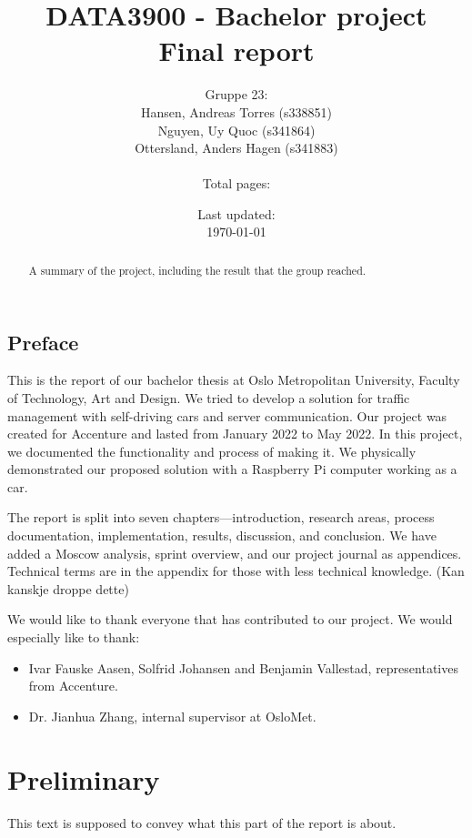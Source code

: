 \documentclass[14pt, a4paper, english]{report}
\title
{
	DATA3900 - Bachelor project \\
	Final report
}
\author{Gruppe 23:\\
    Hansen, Andreas Torres (s338851)\\
	Nguyen, Uy Quoc (s341864)\\
	Ottersland, Anders Hagen (s341883)\\
	\\Total pages: \pageref{LastPage}}
\date{Last updated:\\ \today}
\begin{document}
%	
	\maketitle
	\begin{abstract}
		A summary of the project, including the result that the group reached.
	\end{abstract}
	\clearpage
	\chapter*{Preface}
This is the report of our bachelor thesis at Oslo Metropolitan University, Faculty of Technology, Art and Design. We tried to develop a solution for traffic management with self-driving cars and server communication. Our project was created for Accenture and lasted from January 2022 to May 2022. In this project, we documented the functionality and process of making it. We physically demonstrated our proposed solution with a Raspberry Pi computer working as a car. 
	
	The report is split into seven chapters—introduction, research areas, process documentation, implementation, results, discussion, and conclusion. We have added a Moscow analysis, sprint overview, and our project journal as appendices. Technical terms are in the appendix for those with less technical knowledge. (Kan kanskje droppe dette)
	
	We would like to thank everyone that has contributed to our project. We would especially like to thank:
	\begin{itemize}
		\item Ivar Fauske Aasen, Solfrid Johansen and Benjamin Vallestad, representatives from Accenture.
		\item Dr. Jianhua Zhang, internal supervisor at OsloMet.
	\end{itemize}
	\tableofcontents
	\clearpage
	\pagestyle{fancy}
	\part{Preliminary}
	This text is supposed to convey what this part of the report is about.
	
\end{document}
